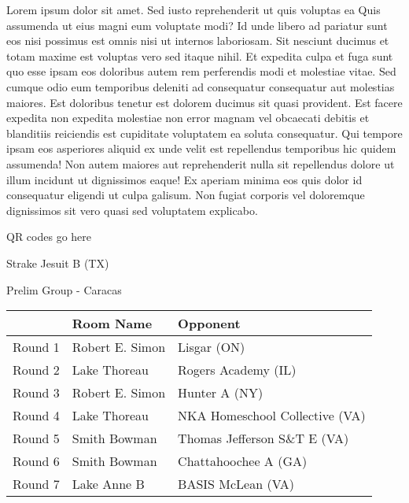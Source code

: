 \documentclass{article}%
\begin{document}
\vspace*{8pt}%
\linebreak%
\newline%
\newline%
Lorem ipsum dolor sit amet. Sed iusto reprehenderit ut quis voluptas ea Quis assumenda ut eius magni eum voluptate modi? Id unde libero ad pariatur sunt eos nisi possimus est omnis nisi ut internos laboriosam. Sit nesciunt ducimus et totam maxime est voluptas vero sed itaque nihil. Et expedita culpa et fuga sunt quo esse ipsam eos doloribus autem rem perferendis modi et molestiae vitae.\newline%
\newline%
Sed cumque odio eum temporibus deleniti ad consequatur consequatur aut molestias maiores. Est doloribus tenetur est dolorem ducimus sit quasi provident. Est facere expedita non expedita molestiae non error magnam vel obcaecati debitis et blanditiis reiciendis est cupiditate voluptatem ea soluta consequatur. Qui tempore ipsam eos asperiores aliquid ex unde velit est repellendus temporibus hic quidem assumenda!\newline%
\newline%
Non autem maiores aut reprehenderit nulla sit repellendus dolore ut illum incidunt ut dignissimos eaque! Ex aperiam minima eos quis dolor id consequatur eligendi ut culpa galisum. Non fugiat corporis vel doloremque dignissimos sit vero quasi sed voluptatem explicabo.\newline%
\newline%
%
\vspace*{30pt}%
\begin{center}%
\begin{Huge}%
QR codes go here%
\end{Huge}%
\end{center}%
\newpage%
%
\begin{center}%
\begin{Huge}%
Strake Jesuit B (TX)%
\end{Huge}%
\vspace*{8pt}%
\linebreak%
\begin{Large}%
Prelim Group {-} Caracas%
\end{Large}%
\end{center}%
\begin{tabularx}{\textwidth}{|c|Y|Y|}%
\hline%
&Room Name&Opponent\\%
\hline%
Round 1&Robert E. Simon&Lisgar (ON)\\%
Round 2&Lake Thoreau&Rogers Academy (IL)\\%
Round 3&Robert E. Simon&Hunter A (NY)\\%
Round 4&Lake Thoreau&NKA Homeschool Collective (VA)\\%
Round 5&Smith Bowman&Thomas Jefferson S\&T E (VA)\\%
Round 6&Smith Bowman&Chattahoochee A (GA)\\%
Round 7&Lake Anne B&BASIS McLean (VA)\\%
\hline%
\end{tabularx}%
\end{document}
